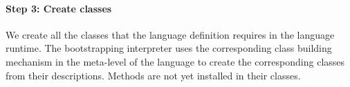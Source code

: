 \paragraph{\textbf{Step 3: Create classes}}
We create all the classes that the language definition requires in the language runtime. The bootstrapping interpreter uses the corresponding class building mechanism in the meta-level of the language to create the corresponding classes from their descriptions. Methods are not yet installed in their classes.


